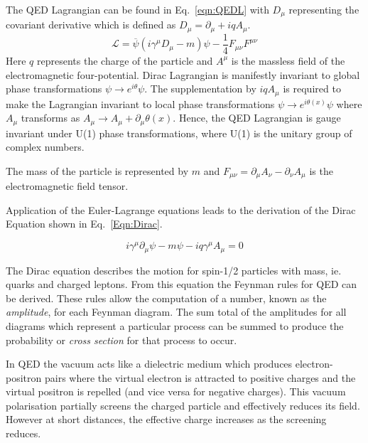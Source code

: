 The QED Lagrangian can be found in Eq.~\ref{eqn:QEDL} with $D_{\mu}$ representing the covariant derivative which is defined as $D_{\mu} = \partial_{\mu} + iqA_{\mu}$. 
\begin{equation}
\mathcal{L} = \overline{\psi}\left(i\gamma^{\mu}D_{\mu}-m\right)\psi - \frac{1}{4}F_{\mu\nu}F^{\mu\nu}
\label{eqn:QEDL}
\end{equation}
Here $q$ represents the charge of the particle and $A^{\mu}$ is the massless field of the electromagnetic four-potential. Dirac Lagrangian is manifestly invariant to global phase transformations $\psi \rightarrow e^{i\theta} \psi$. The supplementation by $iqA_{\mu}$ is required to make the Lagrangian invariant to local phase transformations $\psi \rightarrow e^{i\theta(x)} \psi$ where $A_{\mu}$ transforms as $A_{\mu} \rightarrow A_{\mu} + \partial_{\mu}\theta(x)$. Hence, the QED Lagrangian is gauge invariant under U(1) phase transformations, where U(1) is the unitary group of complex numbers. 

The mass of the particle is represented by $m$ and $F_{\mu\nu} = \partial_{\mu}A_{\nu} - \partial_{\nu}A_{\mu}$ is the electromagnetic field tensor.

Application of the Euler-Lagrange equations leads to the derivation of the Dirac Equation shown in Eq.~\ref{Eqn:Dirac}.

\begin{equation}
i\gamma^{\mu }\partial _{\mu }\psi -m\psi - iq\gamma^{\mu }A_{\mu} = 0
\label{Eqn:Dirac}
\end{equation}

The Dirac equation describes the motion for spin-1/2 particles with mass, ie. quarks and charged leptons. From this equation the Feynman rules for QED can be derived. These rules allow the computation of a number, known as the \emph{amplitude}, for each Feynman diagram. The sum total of the amplitudes for all diagrams which represent a particular process can be summed to produce the probability or \emph{cross section} for that process to occur.

In QED the vacuum acts like a dielectric medium which produces electron-positron pairs where the virtual electron is attracted to positive charges and the virtual positron is repelled (and vice versa for negative charges). This vacuum polarisation partially screens the charged particle and effectively reduces its field. However at short distances, the effective charge increases as the screening reduces.

